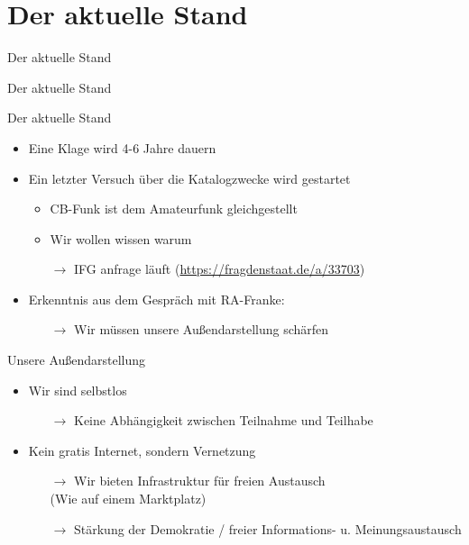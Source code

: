 \section*{Der aktuelle Stand}
\begin{frame}{Der aktuelle Stand}
    \begin{center}
        Der aktuelle Stand
    \end{center}
\end{frame}

\begin{frame}{Der aktuelle Stand}
    \begin{itemize}
        \item Eine Klage wird 4-6 Jahre dauern
        \item Ein letzter Versuch über die Katalogzwecke wird gestartet
        \begin{itemize}
            \item CB-Funk ist dem Amateurfunk gleichgestellt
            \item Wir wollen wissen warum
            \item[$\rightarrow$] IFG anfrage läuft (\url{https://fragdenstaat.de/a/33703})
        \end{itemize}
        \item Erkenntnis aus dem Gespräch mit RA-Franke:
        \begin{itemize}
            \item[$\rightarrow$] Wir müssen unsere Außendarstellung schärfen
        \end{itemize}
    \end{itemize}
\end{frame}

\begin{frame}{Unsere Außendarstellung}
    \begin{itemize}
        \item Wir sind selbstlos
        \begin{itemize}
            \item[$\rightarrow$] Keine Abhängigkeit zwischen Teilnahme und Teilhabe
        \end{itemize}
        \item Kein gratis Internet, sondern Vernetzung
        \begin{itemize}
            \item[$\rightarrow$] Wir bieten Infrastruktur für freien Austausch\\
                (Wie auf einem Marktplatz)
            \item[$\rightarrow$] Stärkung der Demokratie / freier Informations- u. Meinungsaustausch
        \end{itemize}
    \end{itemize}
\end{frame}

